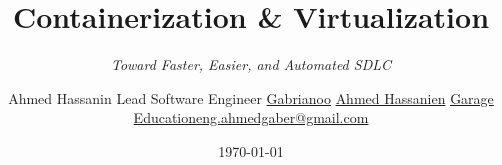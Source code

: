 \title[Containerization \& Virtualization] %
{Containerization \& Virtualization}

\subtitle{\textit{Toward Faster, Easier, and Automated SDLC}}

\author[Ahmed Hassanin] {
	Ahmed Hassanin \newline Lead Software Engineer \newline 
	\faGithub \space \href{https://github.com/gabrianoo}{Gabrianoo}	
	\faLinkedin \space \href{https://www.linkedin.com/in/ahmedgaber}{Ahmed Hassanien}
	\faYoutubePlay \space \href{https://youtube.com/c/GarageEducation}{Garage Education}\newline	\faEnvelope \space \href{mailto: eng.ahmedgaber@gmail.com}{eng.ahmedgaber@gmail.com} 
}


\date{\today}





